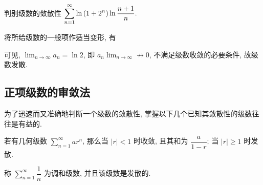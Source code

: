 
\begin{example}
    判别级数的敛散性 $\displaystyle\sum_{n=1}^{\infty}\ln\qty(1+2^n)\ln\dfrac{n+1}{n}.$
\end{example}
\begin{solution}
    将所给级数的一般项作适当变形, 有
    可见, $\displaystyle\lim_{n\to\infty}a_n=\ln 2$, 即 $\displaystyle a_n\lim_{n\to\infty}\not\to0$, 不满足级数收敛的必要条件, 故级数发散.
\end{solution}

\subsection{正项级数的审敛法}

为了迅速而又准确地判断一个级数的敛散性, 掌握以下几个已知其敛散性的级数往往是有益的.

\begin{definition}[几何级数]
    若有几何级数 $\displaystyle\sum_{n=1}^{\infty}ar^n$, 那么当 $|r|<1$ 时收敛, 且其和为 $\dfrac{a}{1-r}$; 当 $|r|\geqslant 1$ 时发散.
\end{definition}

\begin{definition}[调和级数]
    称 $\displaystyle\sum_{n=1}^{\infty}\dfrac{1}{n}$ 为调和级数, 并且该级数是发散的.
\end{definition}

